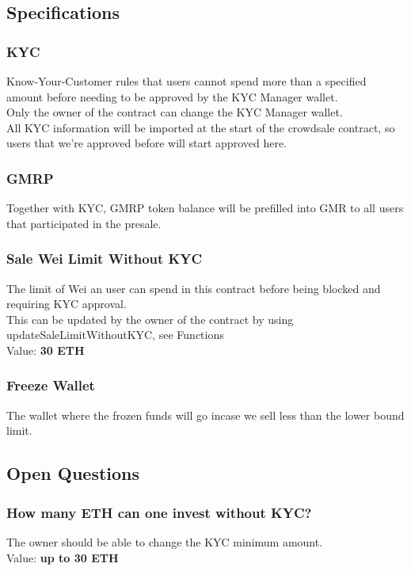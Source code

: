 \documentclass[11pt]{article} %
\begin{document}
\subsection{Specifications}
\subsubsection{KYC}
Know-Your-Customer rules that users cannot spend more than a specified amount before needing to be approved by the KYC Manager wallet.\\
Only the owner of the contract can change the KYC Manager wallet.\\
All KYC information will be imported at the start of the crowdsale contract, so users that we're approved before will start approved here.

\subsubsection{GMRP}
Together with KYC, GMRP token balance will be prefilled into GMR to all users that participated in the presale.

\subsubsection{Sale Wei Limit Without KYC}
The limit of Wei an user can spend in this contract before being blocked and requiring KYC approval.\\
This can be updated by the owner of the contract by using updateSaleLimitWithoutKYC, see Functions\\
Value: \textbf{30 ETH}\\

\subsubsection{Freeze Wallet}
The wallet where the frozen funds will go incase we sell less than the lower bound limit.

\subsection {Open Questions}

\subsubsection{How many ETH can one invest without KYC?}
The owner should be able to change the KYC minimum amount.\\
Value: \textbf{up to 30 ETH}
\end{document}

